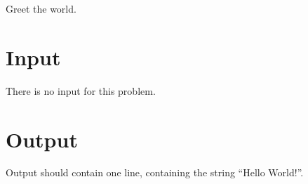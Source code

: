 
Greet the world.

\section*{Input}

There is no input for this problem.

\section*{Output}

Output should contain one line, containing the string “Hello World!”.

